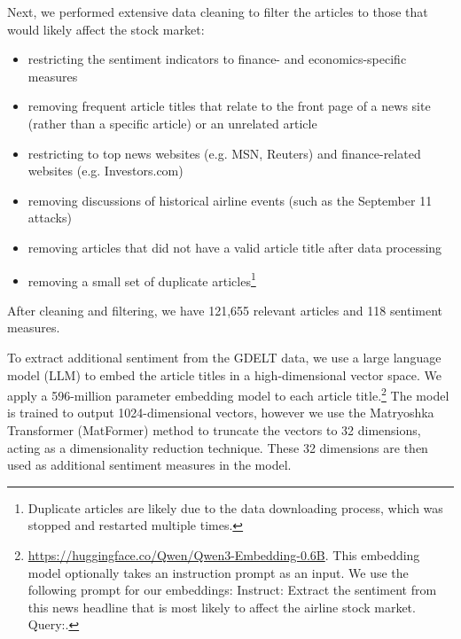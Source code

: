 \documentclass[12pt]{article}
\begin{document}
Next, we performed extensive data cleaning to filter the articles to those that would likely affect the stock market:
\begin{itemize}
\singlespacing
    \item restricting the sentiment indicators to finance- and economics-specific measures
    \item removing frequent article titles that relate to the front page of a news site (rather than a specific article) or an unrelated article
    \item restricting to top news websites (e.g. MSN, Reuters) and finance-related websites (e.g. Investors.com)
    \item removing discussions of historical airline events (such as the September 11 attacks)
    \item removing articles that did not have a valid article title after data processing
    \item removing a small set of duplicate articles\footnote{Duplicate articles are likely due to the data downloading process, which was stopped and restarted multiple times.}
\end{itemize}
After cleaning and filtering, we have 121,655 relevant articles and 118 sentiment measures.

To extract additional sentiment from the GDELT data, we use a large language model (LLM) to embed the article titles in a high-dimensional vector space. We apply a 596-million parameter embedding model to each article title.\footnote{\url{https://huggingface.co/Qwen/Qwen3-Embedding-0.6B}. This embedding model optionally takes an instruction prompt as an input. We use the following prompt for our embeddings: \textsf{Instruct: Extract the sentiment from this news headline that is most likely to affect the airline stock market. Query:}.} The model is trained to output 1024-dimensional vectors, however we use the Matryoshka Transformer (MatFormer) method to truncate the vectors to 32 dimensions, acting as a dimensionality reduction technique. These 32 dimensions are then used as additional sentiment measures in the model.
\end{document}
